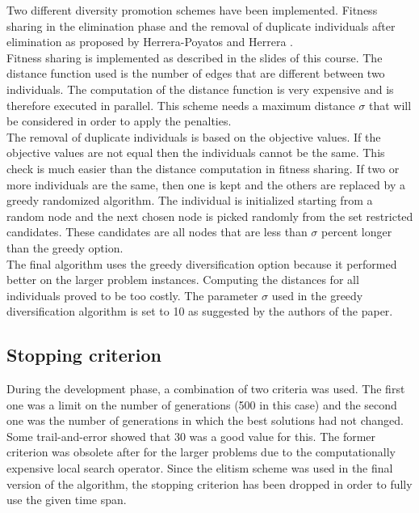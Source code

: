 \documentclass[a4paper,10pt]{article}
\newcommand{\ReplaceMe}[1]{{\color{blue}#1}}
\begin{document}
Two different diversity promotion schemes have been implemented. Fitness sharing in the elimination phase and the removal of duplicate individuals after elimination as proposed by Herrera-Poyatos and Herrera \cite{herrera}.\\
Fitness sharing is implemented as described in the slides of this course. The distance function used is the number of edges that are different between two individuals. The computation of the distance function is very expensive and is therefore executed in parallel. This scheme needs a maximum distance $\sigma$ that will be considered in order to apply the penalties.\\
The removal of duplicate individuals is based on the objective values. If the objective values are not equal then the individuals cannot be the same. This check is much easier than the distance computation in fitness sharing. If two or more individuals are the same, then one is kept and the others are replaced by a greedy randomized algorithm. The individual is initialized starting from a random node and the next chosen node is picked randomly from the set restricted candidates. These candidates are all nodes that are less than $\sigma$ percent longer than the greedy option.\\
The final algorithm uses the greedy diversification option because it performed better on the larger problem instances. Computing the distances for all individuals proved to be too costly. The parameter $\sigma$ used in the greedy diversification algorithm is set to 10 as suggested by the authors of the paper.

\subsection{Stopping criterion}


During the development phase, a combination of two criteria was used. The first one was a limit on the number of generations (500 in this case) and the second one was the number of generations in which the best solutions had not changed. Some trail-and-error showed that 30 was a good value for this. The former criterion was obsolete after for the larger problems due to the computationally expensive local search operator. Since the elitism scheme was used in the final version of the algorithm, the stopping criterion has been dropped in order to fully use the given time span.
\end{document}
